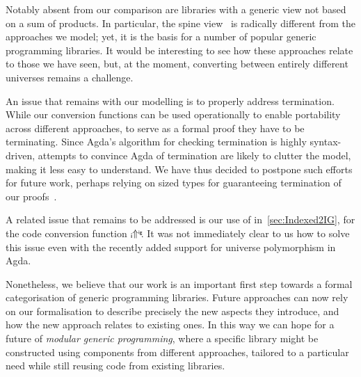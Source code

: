\documentclass[submission,copyright,creativecommons,sharealike,noncommercial]{eptcs}
\newcommand{\Varid}[1]{\mathit{#1}}
\renewcommand\Varid[1]{\mathord{\textsf{#1}}}
\begin{document}
Notably absent from our comparison are libraries with a generic view not based
on a sum of products. In particular, the spine view~\cite{SYBreloaded} is
radically different from the approaches we model;
yet, it is the basis for a number of popular generic programming libraries.
It would be interesting to see how these approaches relate to those we have
seen, but, at the moment, converting between entirely different universes
remains a challenge.

An issue that remains with our modelling is to properly address termination.
While our conversion functions can be used operationally to enable portability
across different approaches, to serve as a formal proof they have to be
terminating. Since Agda's algorithm for checking termination is highly
syntax-driven, attempts to convince Agda of termination are likely
to clutter the model, making it less easy to understand. We have thus decided
to postpone such efforts for future work, perhaps relying on sized types for
guaranteeing termination of our proofs~\cite{MiniAgda}.

A related issue that remains to be addressed is
our use of  in~\autoref{sec:Indexed2IG}, for the code conversion
function \ensuremath{{}_{\kern0.05em \Varid{i}}\!\!\Uparrow^{_{\Varid{ig}}}\!\!}. It was not immediately clear to us how to solve this issue
even with the recently added support for universe polymorphism in Agda.

Nonetheless, we believe that our work is an important first step towards a
formal categorisation of generic programming libraries. Future approaches
can now rely on our formalisation to describe precisely the new aspects
they introduce, and how the new approach relates to existing ones. In this way
we can hope for a future of \emph{modular generic programming}, where a
specific library might be constructed using components from different
approaches, tailored to a particular need while still reusing code from
existing libraries.




\end{document}
